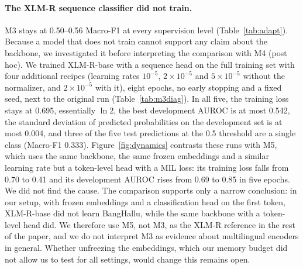 \documentclass[manuscript,screen,review]{acmart}
\newcommand{\fit}[1]{\resizebox{\ifdim\width>\linewidth\linewidth\else\width\fi}{!}{#1}}
\begin{document}
\begin{table}[t]
\caption{Adaptation to Bengali with 0, 10, 25 and 100\% of the 5,627 training examples (three seeds; the 0\% rows are an untrained head): 564 examples already give BanglaBERT-large 93\% of its full-data Macro-F1. CI is a seed-averaged bootstrap interval.}
\label{tab:adapt}
\small
\fit{}
\end{table}

\paragraph{The XLM-R sequence classifier did not train.}
M3 stays at 0.50--0.56 Macro-F1 at every supervision level (Table~\ref{tab:adapt}). Because a model that does not train cannot support any claim about the backbone, we investigated it before interpreting the comparison with M4 (post hoc). We trained XLM-R-base with a sequence head on the full training set with four additional recipes (learning rates $10^{-5}$, $2\times10^{-5}$ and $5\times10^{-5}$ without the normalizer, and $2\times10^{-5}$ with it), eight epochs, no early stopping and a fixed seed, next to the original run (Table~\ref{tab:m3diag}). In all five, the training loss stays at 0.695, essentially $\ln 2$, the best development AUROC is at most 0.542, the standard deviation of predicted probabilities on the development set is at most 0.004, and three of the five test predictions at the 0.5 threshold are a single class (Macro-F1 0.333). Figure~\ref{fig:dynamics} contrasts these runs with M5, which uses the same backbone, the same frozen embeddings and a similar learning rate but a token-level head with a MIL loss: its training loss falls from 0.70 to 0.41 and its development AUROC rises from 0.69 to 0.85 in five epochs. We did not find the cause. The comparison supports only a narrow conclusion: in our setup, with frozen embeddings and a classification head on the first token, XLM-R-base did not learn BangHallu, while the same backbone with a token-level head did. We therefore use M5, not M3, as the XLM-R reference in the rest of the paper, and we do not interpret M3 as evidence about multilingual encoders in general. Whether unfreezing the embeddings, which our memory budget did not allow us to test for all settings, would change this remains open.

\begin{table}[t]
\caption{Diagnostic runs for the XLM-R sequence classifier (post hoc; full training set, seed 42; the first row is the original configuration): no recipe moves the training loss away from $\ln 2$. Loss is the final training loss; dev-prob.\ SD is the standard deviation of predicted probabilities on the development set.}
\label{tab:m3diag}
\small
\fit{}
\end{table}
\end{document}

